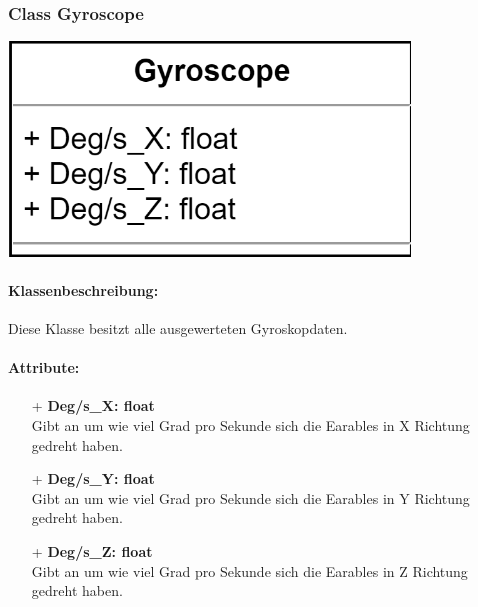 \documentclass[a4paper,12pt]{article}
\begin{document}
\begin{minipage}[b]{0.5\textwidth}
	\subsubsection{Class Gyroscope}
	
	\end{minipage}
	\begin{minipage}[c]{0.5\textwidth}
	\includegraphics[width=0.8\textwidth]{bilder/BibPackageKlassen/Gyroscope.png}
\end{minipage}
\paragraph{Klassenbeschreibung:}
Diese Klasse besitzt alle ausgewerteten Gyroskopdaten.

\paragraph{Attribute:}
\begin{itemize}
	\item[+] \textbf{Deg/s\_X: float}\\Gibt an um wie viel Grad pro Sekunde sich die \Gls{Earables} in X Richtung gedreht haben.
	\item[+] \textbf{Deg/s\_Y: float}\\Gibt an um wie viel Grad pro Sekunde sich die \Gls{Earables} in Y Richtung gedreht haben.
	\item[+] \textbf{Deg/s\_Z: float}\\Gibt an um wie viel Grad pro Sekunde sich die \Gls{Earables} in Z Richtung gedreht haben.
\end{itemize}
\end{document}
